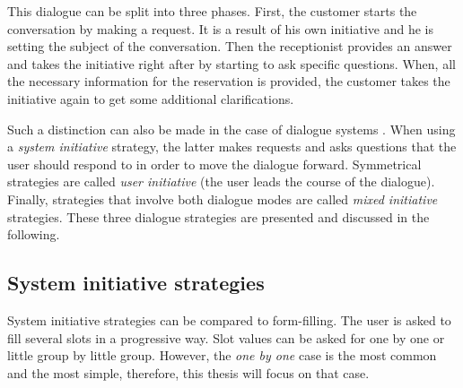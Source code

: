 	This dialogue can be split into three phases. First, the customer starts the conversation by making a request. It is a result of his own initiative and he is setting the subject of the conversation. Then the receptionist provides an answer and takes the initiative right after by starting to ask specific questions. When, all the necessary information for the reservation is provided, the customer takes the initiative again to get some additional clarifications.
	
	Such a distinction can also be made in the case of dialogue systems \cite{Ferguson2007}. When using a \textit{system initiative} strategy, the latter makes requests and asks questions that the user should respond to in order to move the dialogue forward. Symmetrical strategies are called \textit{user initiative} (the user leads the course of the dialogue). Finally, strategies that involve both dialogue modes are called \textit{mixed initiative} strategies. These three dialogue strategies are presented and discussed in the following.
	
	\subsection{System initiative strategies}
	
		System initiative strategies can be compared to form-filling. The user is asked to fill several slots in a progressive way. Slot values can be asked for one by one or little group by little group. However, the \textit{one by one} case is the most common and the most simple, therefore, this thesis will focus on that case.
		
